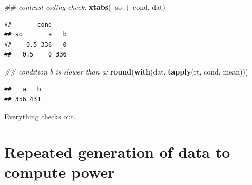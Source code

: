 \documentclass[12pt,]{krantz}
\newenvironment{Shaded}{\begin{snugshade}}{\end{snugshade}}
\newcommand{\CommentTok}[1]{\textcolor[rgb]{0.56,0.35,0.01}{\textit{#1}}}
\newcommand{\KeywordTok}[1]{\textcolor[rgb]{0.13,0.29,0.53}{\textbf{#1}}}
\newcommand{\NormalTok}[1]{#1}
\newcommand{\OperatorTok}[1]{\textcolor[rgb]{0.81,0.36,0.00}{\textbf{#1}}}
\newcommand{\StringTok}[1]{\textcolor[rgb]{0.31,0.60,0.02}{#1}}
\begin{document}
\begin{Shaded}
\begin{Highlighting}[]
\CommentTok{## contrast coding check:}
\KeywordTok{xtabs}\NormalTok{(}\OperatorTok{~}\NormalTok{so }\OperatorTok{+}\StringTok{ }\NormalTok{cond, dat)}
\end{Highlighting}
\end{Shaded}

\begin{verbatim}
##       cond
## so       a   b
##   -0.5 336   0
##   0.5    0 336
\end{verbatim}

\begin{Shaded}
\begin{Highlighting}[]
\CommentTok{## condition b is slower than a:}
\KeywordTok{round}\NormalTok{(}\KeywordTok{with}\NormalTok{(dat, }\KeywordTok{tapply}\NormalTok{(rt, cond, mean)))}
\end{Highlighting}
\end{Shaded}

\begin{verbatim}
##   a   b 
## 356 431
\end{verbatim}

Everything checks out.

\hypertarget{repeated-generation-of-data-to-compute-power}{%
\section{Repeated generation of data to compute power}\label{repeated-generation-of-data-to-compute-power}}
\end{document}
